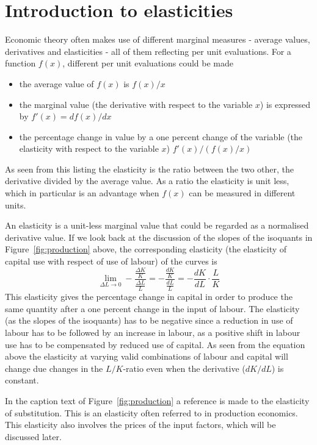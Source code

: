 \documentclass[11pt,fleqn]{book} %
\begin{document}
\section{Introduction to elasticities}\label{elast}

Economic theory often makes use of different marginal measures - average values, derivatives and elasticities - all of them reflecting per unit evaluations. For a function $f(x)$, different per unit evaluations could be made
\begin{itemize}
\item the average value of $f(x)$ is $f(x) / x$
\item the marginal value (the derivative with respect to the variable $x$) is expressed by $f'(x) = df(x)/dx$
\item the percentage change in value by a one percent change of the variable (the elasticity with respect to the variable $x$) $f'(x) / (f(x)/x)$
\end{itemize}
\hfill\break
As seen from this listing the elasticity is the ratio between the two other, the derivative divided by the average value. As a ratio the elasticity is unit less, which in particular is an advantage when $f(x)$ can be measured in different units.

An elasticity is a unit-less marginal value that could be regarded as a normalised derivative value. If we look back at the discussion of the slopes of the isoquants in Figure~\ref{fig:production} above, the corresponding elasticity (the elasticity of capital use with respect of use of labour) of the curves is
\begin{equation*} 
\lim_{\Delta L \to 0} -\frac{\frac{\Delta K}{K}}{\frac{\Delta L}{L}} = -\frac{\frac{dK}{K}}{\frac{dL}{L}} = - \frac{dK}{dL} \cdot \frac{L}{K}
\end{equation*}
This elasticity gives the percentage change in capital in order to produce the same quantity after a one percent change in the input of labour. The elasticity (as the slopes of the isoquants) has to be negative since a reduction in use of labour has to be followed by an increase in labour, as a positive shift in labour use has to be compensated by reduced use of capital. As seen from the equation above the elasticity at varying valid combinations of labour and capital will change due changes in the $L/K$-ratio even when the derivative ($dK/dL$) is constant.

In the caption text of Figure~\ref{fig:production} a reference is made to the elasticity of substitution. This is an elasticity often referred to in production economics. This elasticity also involves the prices of the input factors, which will be discussed later.
\end{document}
